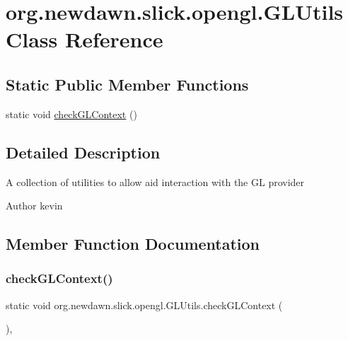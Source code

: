 \hypertarget{classorg_1_1newdawn_1_1slick_1_1opengl_1_1_g_l_utils}{}\section{org.\+newdawn.\+slick.\+opengl.\+G\+L\+Utils Class Reference}
\label{classorg_1_1newdawn_1_1slick_1_1opengl_1_1_g_l_utils}
\subsection*{Static Public Member Functions}
\begin{DoxyCompactItemize}
\item 
static void \mbox{\hyperlink{classorg_1_1newdawn_1_1slick_1_1opengl_1_1_g_l_utils_abd198c115d89b2112d06f109392d8b0f}{check\+G\+L\+Context}} ()
\end{DoxyCompactItemize}


\subsection{Detailed Description}
A collection of utilities to allow aid interaction with the GL provider

\begin{DoxyAuthor}{Author}
kevin 
\end{DoxyAuthor}


\subsection{Member Function Documentation}
\mbox{\label{classorg_1_1newdawn_1_1slick_1_1opengl_1_1_g_l_utils_abd198c115d89b2112d06f109392d8b0f}} 
\subsubsection{\texorpdfstring{check\+G\+L\+Context()}{checkGLContext()}}
{\footnotesize\ttfamily static void org.\+newdawn.\+slick.\+opengl.\+G\+L\+Utils.\+check\+G\+L\+Context (\begin{DoxyParamCaption}{ }\end{DoxyParamCaption})\hspace{0.3cm}{\ttfamily [inline]}, {\ttfamily [static]}}

